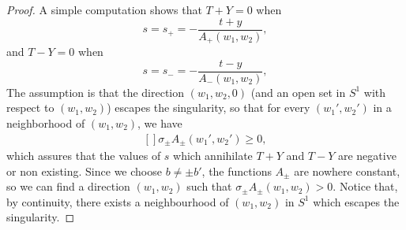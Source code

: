 \begin{proof}
		A simple computation shows that $T+Y=0$ when
		\begin{equation}
			s=s_+=-\frac{ t+y }{ A_+(w_1,w_2) },
		\end{equation}
		and $T-Y=0$ when
		\begin{equation}
			s=s_-=-\frac{ t-y }{ A_-(w_1,w_2) },
		\end{equation}
		The assumption is that the direction $(w_1,w_2,0)$ (and an open set in $S^1$ with respect to $(w_1,w_2)$) escapes the singularity, so that for every $(w_1',w_2')$ in a neighborhood of $(w_1,w_2)$, we have
		\begin{equation}
			\begin{aligned}[]
				\sigma_{\pm}A_{\pm}(w_1',w_2')\geq 0,
			\end{aligned}
		\end{equation}
		which assures that the values of $s$ which annihilate $T+Y$ and $T-Y$ are negative or non existing. Since we choose $b\neq \pm b'$, the functions $A_{\pm}$ are nowhere constant, so we can find a direction $(w_1,w_2)$ such that $\sigma_{\pm}A_{\pm}(w_1,w_2)>0$. Notice that, by continuity, there exists a neighbourhood of $(w_1,w_2)$ in $S^1$ which escapes the singularity.


\end{proof}
